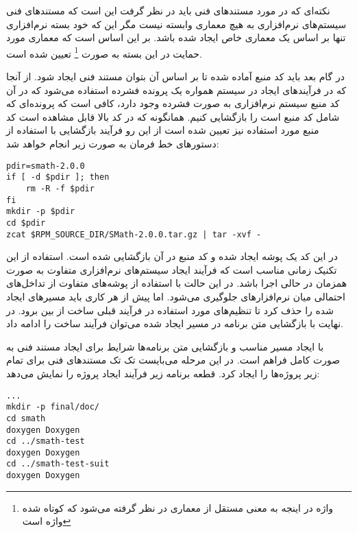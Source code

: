 نکته‌ای که در مورد مستندهای فنی باید در نظر گرفت این است که مستندهای فنی
سیستم‌های نرم‌افزاری به هیچ معماری وابسته نیست مگر این که خود بسته نرم‌افزاری
تنها بر اساس یک معماری خاص ایجاد شده باشد. بر این اساس است که معماری مورد حمایت
در این بسته به صورت 
\footnote{واژه  در اینجه به معنی مستقل از معماری در نظر
گرفته می‌شود که کوتاه شده واژه  است}
تعیین شده است.
 
در گام بعد باید کد منبع آماده شده تا بر اساس آن  بتوان مستند فنی ایجاد شود. از
آنجا که در فرآیندهای ایجاد در سیستم  همواره یک پرونده فشرده استفاده
می‌شود که در آن کد منبع سیستم نرم‌افزاری به صورت فشرده وجود دارد، کافی است که
پرونده‌ای که شامل کد منبع است را بازگشایی کنیم. همانگونه که در کد بالا قابل
مشاهده است کد منبع مورد استفاده نیز تعیین شده است از این رو فرآیند بازگشایی با
استفاده از دستورهای خط فرمان به صورت زیر انجام خواهد شد:

\begin{latin}
\lstset{language=TeX}  
\begin{lstlisting}[frame=single]
pdir=smath-2.0.0
if [ -d $pdir ]; then
	rm -R -f $pdir
fi
mkdir -p $pdir
cd $pdir
zcat $RPM_SOURCE_DIR/SMath-2.0.0.tar.gz | tar -xvf -
\end{lstlisting}
\end{latin}

در این کد یک پوشه ایجاد شده و کد منبع در آن بازگشایی شده است. استفاده از این
تکنیک زمانی مناسب است که فرآیند ایجاد سیستم‌های نرم‌افزاری متفاوت به صورت همزمان
در حالی اجرا باشد. در این حالت با استفاده از پوشه‌های متفاوت از تداخل‌های
احتمالی میان نرم‌افزارهای جلوگیری می‌شود. اما پیش از هر کاری باید مسیرهای ایجاد
شده را حذف کرد تا تنظیم‌های مورد استفاده در فرآیند قبلی ساخت از بین برود. در
نهایت با بازگشایی متن برنامه در مسیر ایجاد شده می‌توان فرآیند ساخت را ادامه داد.

با ایجاد مسیر مناسب و بازگشایی متن برنامه‌ها شرایط برای ایجاد مستند فنی به صورت
کامل فراهم است. در این مرحله می‌بایست تک تک مستند‌های فنی برای تمام زیر پروژه‌ها
را ایجاد کرد. قطعه برنامه زیر فرآیند ایجاد پروژه را نمایش می‌دهد: 

\begin{latin}
\lstset{language=TeX}  
\begin{lstlisting}[frame=single] 
...
mkdir -p final/doc/
cd smath
doxygen Doxygen
cd ../smath-test
doxygen Doxygen
cd ../smath-test-suit
doxygen Doxygen
\end{lstlisting}
\end{latin}

